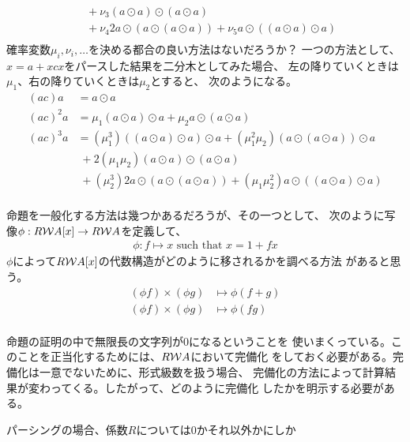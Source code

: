 {\begin{description}
\begin{equation*}
\begin{split}
			&\; + \nu_3(a\odot a)\odot(a\odot a) \\
			&\; + \nu_4{2}a\odot(a\odot(a\odot a))
				+ \nu_5a\odot((a\odot a)\odot a) \\
		\end{split}\end{equation*}
		確率変数$\mu_i,\nu_i,\dots$を決める都合の良い方法はないだろうか？
		一つの方法として、$x=a+xcx$をパースした結果を二分木としてみた場合、
		左の降りていくときは$\mu_1$、右の降りていくときは$\mu_2$とすると、
		次のようになる。
		\begin{equation*}\begin{split}
			(ac)a &= a\odot a \\
			(ac)^2a &= \mu_1(a\odot a)\odot a + \mu_2a\odot(a\odot a) \\
			(ac)^3a &= (\mu_1^3)((a\odot a)\odot a)\odot a 
				+ (\mu_1^2\mu_2)(a\odot(a\odot a))\odot a \\
			&\; + 2(\mu_1\mu_2)(a\odot a)\odot(a\odot a) \\
			&\; + (\mu_2^3){2}a\odot(a\odot(a\odot a))
				+ (\mu_1\mu_2^2)a\odot((a\odot a)\odot a) \\
		\end{split}\end{equation*}
		\item[一般化] 命題を一般化する方法は幾つかあるだろうが、その一つとして、
		次のように写像$\phi: R{{\mathcal{W}}} A[x]\to R{{\mathcal{W}}} A$を定義して、
		\begin{equation*}\begin{split}
			\phi: f \mapsto x \text{ such that } x = 1 + fx
		\end{split}\end{equation*}
		$\phi$によって$R{{\mathcal{W}}} A[x]$の代数構造がどのように移されるかを調べる方法
		があると思う。
		\begin{equation*}\begin{split}
			(\phi f)\times (\phi g) &\mapsto \phi(f + g) \\
			(\phi f)\times (\phi g) &\mapsto \phi(fg) \\
		\end{split}\end{equation*}
		\item[完備化] 命題の証明の中で無限長の文字列が$0$になるということを
		使いまくっている。このことを正当化するためには、$R{{\mathcal{W}}} A$において完備化
		をしておく必要がある。完備化は一意でないために、形式級数を扱う場合、
		完備化の方法によって計算結果が変わってくる。したがって、どのように完備化
		したかを明示する必要がある。
		\item[冪等半体] パーシングの場合、係数$R$については$0$かそれ以外かにしか

\end{description}}
